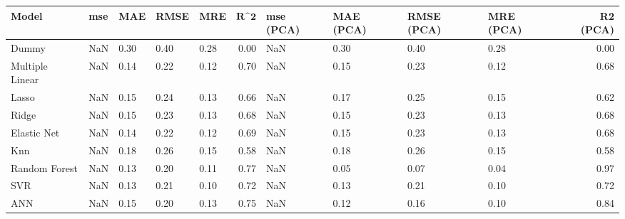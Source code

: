\begin{table}
\centering
\label{table:iri_reg_pred}
\begin{tabular}{lllllrllllr}
\toprule
 \textbf{Model} & \textbf{mse} & \textbf{MAE} & \textbf{RMSE} & \textbf{MRE} & $\textbf{R^2}$ & \textbf{mse (PCA)} & \textbf{MAE (PCA)} & \textbf{RMSE (PCA)} & \textbf{MRE (PCA)} & \textbf{R2 (PCA)} \\
\midrule
          Dummy &          NaN &         0.30 &          0.40 &         0.28 &           0.00 &                NaN &               0.30 &                0.40 &               0.28 &              0.00 \\
Multiple Linear &          NaN &         0.14 &          0.22 &         0.12 &           0.70 &                NaN &               0.15 &                0.23 &               0.12 &              0.68 \\
          Lasso &          NaN &         0.15 &          0.24 &         0.13 &           0.66 &                NaN &               0.17 &                0.25 &               0.15 &              0.62 \\
          Ridge &          NaN &         0.15 &          0.23 &         0.13 &           0.68 &                NaN &               0.15 &                0.23 &               0.13 &              0.68 \\
    Elastic Net &          NaN &         0.14 &          0.22 &         0.12 &           0.69 &                NaN &               0.15 &                0.23 &               0.13 &              0.68 \\
            Knn &          NaN &         0.18 &          0.26 &         0.15 &           0.58 &                NaN &               0.18 &                0.26 &               0.15 &              0.58 \\
  Random Forest &          NaN &         0.13 &          0.20 &         0.11 &           0.77 &                NaN &               0.05 &                0.07 &               0.04 &              0.97 \\
            SVR &          NaN &         0.13 &          0.21 &         0.10 &           0.72 &                NaN &               0.13 &                0.21 &               0.10 &              0.72 \\
            ANN &          NaN &         0.15 &          0.20 &         0.13 &           0.75 &                NaN &               0.12 &                0.16 &               0.10 &              0.84 \\
\bottomrule
\end{tabular}
\end{table}
